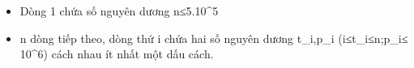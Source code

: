 \begin{itemize}
	\item     Dòng 1 chứa số nguyên dương n≤5.10^5   
	\item     n dòng tiếp theo, dòng thứ i chứa hai số nguyên dương t\_i,p\_i (i≤t\_i≤n;p\_i≤ 10^6) cách nhau ít nhất một dấu cách.   
\end{itemize}



\